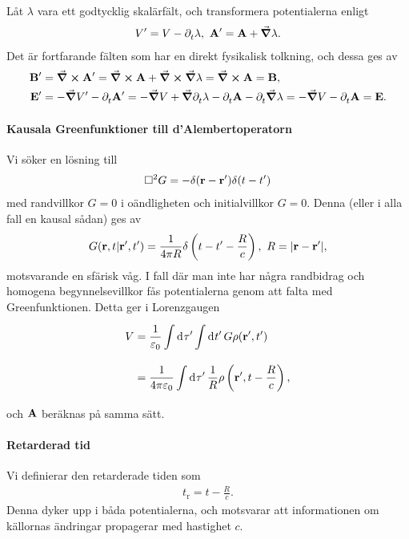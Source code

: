 Låt $\lambda$ vara ett godtycklig skalärfält, och transformera potentialerna enligt
\begin{align*}
	V' = V - \partial_{t}^{}\lambda,\ \vb{A}' = \vb{A} + \grad{\lambda}.
\end{align*}
Det är fortfarande fälten som har en direkt fysikalisk tolkning, och dessa ges av
\begin{align*}
	\vb{B}' &= \curl{\vb{A}'} = \curl{\vb{A}} + \curl{\grad{\lambda}} = \curl{\vb{A}} = \vb{B}, \\
	\vb{E}' &= -\grad{V'} - \partial_{t}^{}\vb{A}' = -\grad{V} + \grad{\partial_{t}^{}\lambda} - \partial_{t}^{}\vb{A} - \partial_{t}^{}\grad{\lambda} = -\grad{V} - \partial_{t}^{}\vb{A} = \vb{E}.
\end{align*}

\paragraph{Kausala Greenfunktioner till d'Alembertoperatorn}
Vi söker en lösning till
\begin{align*}
	\Box^{2}{G} = -\delta(\vb{r} - \vb{r}')\delta(t - t')
\end{align*}
med randvillkor $G = 0$ i oändligheten och initialvillkor $G = 0$. Denna (eller i alla fall en kausal sådan) ges av
\begin{align*}
	G(\vb{r}, t | \vb{r}', t') = \frac{1}{4\pi R}\delta\left(t - t' - \frac{R}{c}\right),\ R = \abs{\vb{r} - \vb{r}'},
\end{align*}
motsvarande en sfärisk våg. I fall där man inte har några randbidrag och homogena begynnelsevillkor fås potentialerna genom att falta med Greenfunktionen. Detta ger i Lorenzgaugen
\begin{align*}
	V &= \frac{1}{\varepsilon_{0}}\int\limits_{}^{}\dd[]{\tau'}\int\limits_{}^{}\dd[]{t'}G\rho(\vb{r}', t') \\
	  &= \frac{1}{4\pi\varepsilon_{0}}\int\limits_{}^{}\dd[]{\tau'}\frac{1}{R}\rho\left(\vb{r}', t - \frac{R}{c}\right),
\end{align*}
och $\vb{A}$ beräknas på samma sätt.

\paragraph{Retarderad tid}
Vi definierar den retarderade tiden som
\begin{align*}
	t_{\text{r}} = t - \frac{R}{c}.
\end{align*}
Denna dyker upp i båda potentialerna, och motsvarar att informationen om källornas ändringar propagerar med hastighet $c$.

